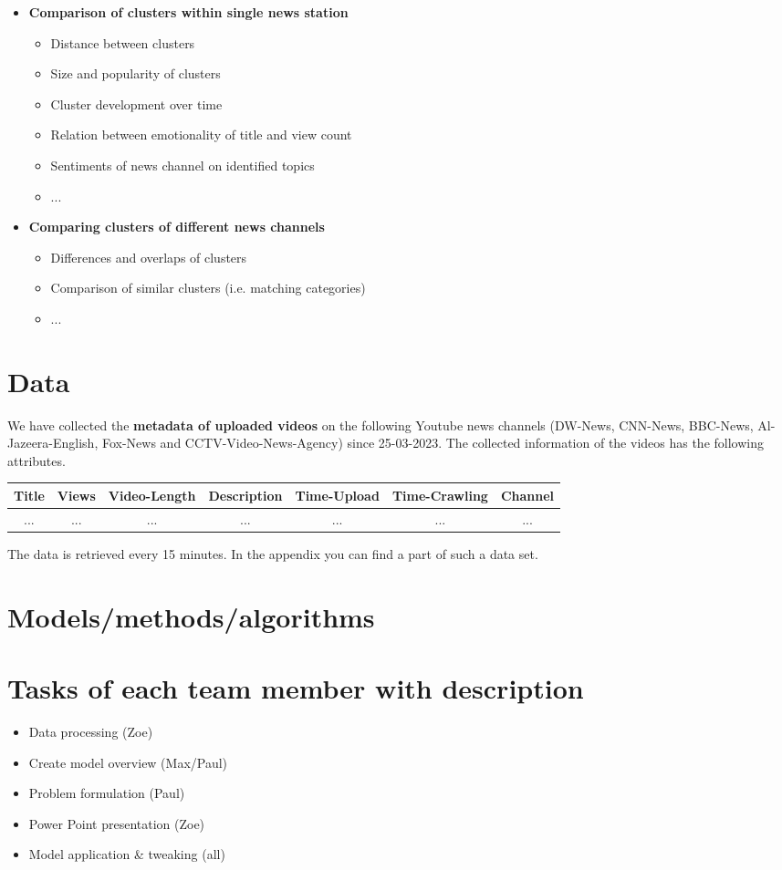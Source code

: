 \documentclass[12pt,a4paper]{scrartcl}
\begin{document}
\begin{itemize}
\begin{itemize}
	\end{itemize}
	\item[\labelitemi] \textbf{Comparison of clusters within single news station}
	\begin{itemize}
		\item Distance between clusters
		\item Size and popularity of clusters
		\item Cluster development over time
		\item Relation between emotionality of title and view count
		\item Sentiments of news channel on identified topics
		\item ...
	\end{itemize}
	\item[\labelitemi] \textbf{Comparing clusters of different news channels}
	\begin{itemize}
		\item Differences and overlaps of clusters
		\item Comparison of similar clusters (i.e. matching categories)
		\item ...
	\end{itemize}
\end{itemize}
\section{Data}
We have collected the \textbf{metadata of uploaded videos} on the following Youtube news channels (DW-News, CNN-News, BBC-News, Al-Jazeera-English, Fox-News and CCTV-Video-News-Agency) since 25-03-2023. The collected information of the videos has the following attributes.\\
\begin{center}
\begin{tabular}{ |c|c|c|c|c|c|c| } 
 \hline
 Title & Views & Video-Length & Description & Time-Upload & Time-Crawling &  Channel\\ 
 \hline
 ... & ... & ... & ... & ... & ... & ... \\
 \hline
\end{tabular}
\end{center}
The data is retrieved every 15 minutes. In the appendix you can find a part of such a data set.
\section{Models/methods/algorithms}
\section{Tasks of each team member with description}
\begin{itemize}
    \item Data processing (Zoe)
    \item Create model overview (Max/Paul)
    \item Problem formulation (Paul)
    \item Power Point presentation (Zoe)
    \item Model application \& tweaking (all)
\end{itemize}
\end{document}
